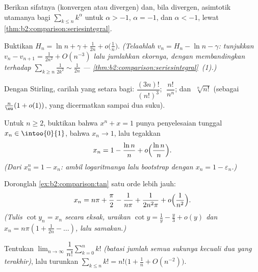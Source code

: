 \begin{exercise}[$\star$]\label{exo:b2:comparison:2}
Berikan sifatnya (konvergen atau divergen) dan, bila divergen,
asimtotik utamanya bagi $\sum_{k \leq n} k^\alpha$ untuk $\alpha >
-1$, $\alpha = -1$, dan $\alpha < -1$, lewat
\cref{thm:b2:comparison:seriesintegral}.
\end{exercise}

\begin{exercise}[$\star\star$]\label{exo:b2:comparison:3}
Buktikan $H_n = \ln n + \gamma + \frac{1}{2n} + o\bigl(\frac1n\bigr)$.
\emph{(Telaahlah $v_n = H_n - \ln n - \gamma$: tunjukkan $v_n - v_{n+1} =
\frac{1}{2n^2} + O(n^{-3})$ lalu jumlahkan ekornya, dengan membandingkan
terhadap $\sum_{k \geq n} \frac{1}{2k^2} \sim \frac{1}{2n}$ ---
\cref{thm:b2:comparison:seriesintegral}~(1).)}
\end{exercise}

\begin{exercise}[$\star\star$]\label{exo:b2:comparison:4}
Dengan Stirling, carilah yang setara bagi: $\dfrac{(3n)!}{(n!)^3}$;
$\;\dfrac{n!}{n^n}$; dan $\;\sqrt[n]{n!}$ (sebagai $\frac n\eu(1 + o(1))$,
yang dicermatkan sampai dua suku).
\end{exercise}

\begin{exercise}[$\star\star$]\label{exo:b2:comparison:5}
Untuk $n \geq 2$, buktikan bahwa $x^n + x = 1$ punya penyelesaian
tunggal $x_n \in \intoo{0}{1}$, bahwa $x_n \to 1$, lalu tegakkan
\[
x_n = 1 - \frac{\ln n}{n} + o\Bigl(\frac{\ln n}{n}\Bigr).
\]
\emph{(Dari $x_n^n = 1 - x_n$: ambil logaritmanya lalu bootstrap dengan
$x_n = 1 - \varepsilon_n$.)}
\end{exercise}

\begin{exercise}[$\star\star$]\label{exo:b2:comparison:6}
Doronglah \cref{ex:b2:comparison:tan} satu orde lebih jauh:
\[
x_n = n\pi + \frac\pi2 - \frac{1}{n\pi} + \frac{1}{2n^2\pi} +
o\Bigl(\frac{1}{n^2}\Bigr).
\]
\emph{(Tulis $\cot y_n = x_n$ secara eksak, uraikan $\cot y = \frac1y -
\frac y3 + o(y)$ dan $x_n = n\pi(1 + \frac{1}{2n} - \dots)$, lalu
samakan.)}
\end{exercise}

\begin{exercise}[$\star\star$]\label{exo:b2:comparison:7}
Tentukan $\lim_{n\to\infty} \dfrac{1}{n!}\sum_{k=0}^{n} k!$
\emph{(batasi jumlah semua sukunya kecuali dua yang terakhir)}, lalu
turunkan  $\sum_{k \leq n} k! = n!\bigl(1 + \frac1n +
O(n^{-2})\bigr)$.
\end{exercise}

